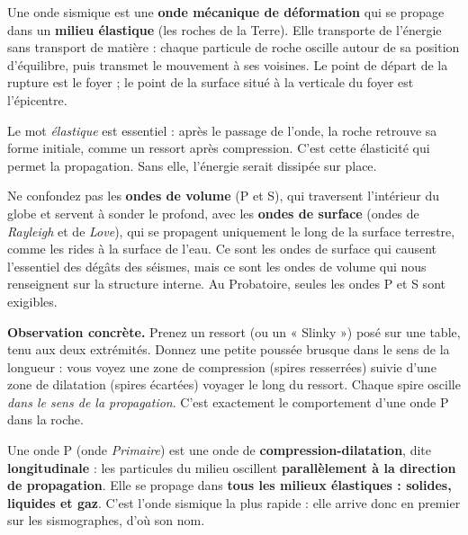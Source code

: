 \documentclass[11pt]{article}
\newcommand{\cle}[1]{{\popxbold\color{popdark}#1}}
\newcounter{popsec}
\newcounter{popsub}
\newcommand{\courssub}[1]{%
  \stepcounter{popsub}%
  \par\vspace{9pt}\noindent{\popxbold\fontsize{11.5}{13}\selectfont\color{popink}{\color{poporange}\thepopsec.\thepopsub}\hspace{6pt}#1}\par\nopagebreak\vspace{4pt}
}
\begin{document}
\begin{definition}
Une \cle{onde sismique} est une \textbf{onde mécanique de déformation} qui se propage dans un \textbf{milieu élastique} (les roches de la Terre). Elle transporte de l'énergie sans transport de matière : chaque particule de roche oscille autour de sa position d'équilibre, puis transmet le mouvement à ses voisines. Le point de départ de la rupture est le \cle{foyer} ; le point de la surface situé à la verticale du foyer est l'\cle{épicentre}.
\end{definition}

Le mot \emph{élastique} est essentiel : après le passage de l'onde, la roche retrouve sa forme initiale, comme un ressort après compression. C'est cette élasticité qui permet la propagation. Sans elle, l'énergie serait dissipée sur place.

\begin{attention}
Ne confondez pas les \textbf{ondes de volume} (P et S), qui traversent l'intérieur du globe et servent à sonder le profond, avec les \textbf{ondes de surface} (ondes de \emph{Rayleigh} et de \emph{Love}), qui se propagent uniquement le long de la surface terrestre, comme les rides à la surface de l'eau. Ce sont les ondes de surface qui causent l'essentiel des dégâts des séismes, mais ce sont les ondes de volume qui nous renseignent sur la structure interne. Au Probatoire, seules les ondes P et S sont exigibles.
\end{attention}

\courssub{Les ondes P : compression et dilatation}

\textbf{Observation concrète.} Prenez un ressort (ou un « Slinky ») posé sur une table, tenu aux deux extrémités. Donnez une petite poussée brusque dans le sens de la longueur : vous voyez une zone de compression (spires resserrées) suivie d'une zone de dilatation (spires écartées) voyager le long du ressort. Chaque spire oscille \emph{dans le sens de la propagation}. C'est exactement le comportement d'une onde P dans la roche.

\begin{definition}[Onde P]
Une \cle{onde P} (onde \emph{Primaire}) est une onde de \textbf{compression-dilatation}, dite \textbf{longitudinale} : les particules du milieu oscillent \textbf{parallèlement à la direction de propagation}. Elle se propage dans \textbf{tous les milieux élastiques : solides, liquides et gaz}. C'est l'onde sismique la plus rapide : elle arrive donc en premier sur les sismographes, d'où son nom.
\end{definition}
\end{document}
